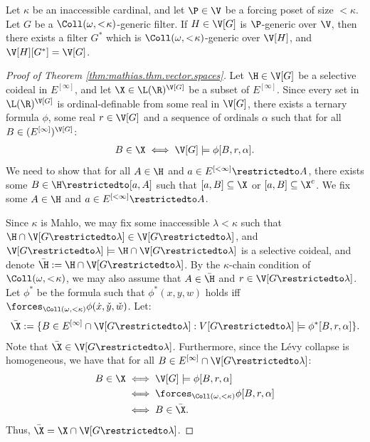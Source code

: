 \documentclass[11pt,reqno]{amsart}
\begin{document}
\begin{lemma}
\label{lem:solovay.factor.lemma}
    Let $\kappa$ be an inaccessible cardinal, and let $\P \in \V$ be a forcing poset of size $<\kappa$. Let $G$ be a $\Coll(\omega,<\!\kappa)$-generic filter. If $H \in \V[G]$ is $\P$-generic over $\V$, then there exists a filter $G^*$ which is $\Coll(\omega,<\!\kappa)$-generic over $\V[H]$, and $\V[H][G^*] = \V[G]$.
\end{lemma}

\begin{proof}[Proof of Theorem \ref{thm:mathias.thm.vector.spaces}]
    Let $\H \in \V[G]$ be a selective coideal in $E^{[\infty]}$, and let $\X \in \L(\R)^{\V[G]}$ be a subset of $E^{[\infty]}$. Since every set in $\L(\R)^{\V[G]}$ is ordinal-definable from some real in $\V[G]$, there exists a ternary formula $\phi$, some real $r \in \V[G]$ and a sequence of ordinals $\alpha$ such that for all $B \in (E^{[\infty]})^{\V[G]}$:
    \begin{align*}
        B \in \X \iff \V[G] \models \phi[B,r,\alpha].
    \end{align*}
    We need to show that for all $A \in \H$ and $a \in E^{[<\infty]}\restrictedto A$, there exists some $B \in \H\restrictedto[a,A]$ such that $[a,B] \subseteq \X$ or $[a,B] \subseteq \X^c$. We fix some $A \in \H$ and $a \in E^{[<\infty]}\restrictedto A$.

    Since $\kappa$ is Mahlo, we may fix some inaccessible $\lambda < \kappa$ such that $\H \cap \V[G\restrictedto\lambda] \in \V[G\restrictedto\lambda]$, and $\V[G\restrictedto\lambda] \models \H \cap \V[G\restrictedto\lambda]$ is a selective coideal, and denote $\bar{\H} := \H \cap \V[G\restrictedto\lambda]$. By the $\kappa$-chain condition of $\Coll(\omega,<\!\kappa)$, we may also assume that $A \in \bar{\H}$ and $r \in \V[G\restrictedto\lambda]$. Let $\phi^*$ be the formula such that $\phi^*(x,y,w)$ holds iff $\forces_{\Coll(\omega,<\kappa)} \phi(\dot{x},\check{y},\check{w})$. Let:
    \begin{align*}
        \bar{\X} := \{B \in E^{[\infty]} \cap \V[G\restrictedto\lambda] : V[G\restrictedto\lambda] \models \phi^*[B,r,\alpha]\}.
    \end{align*}
    Note that $\bar{\X} \in \V[G\restrictedto\lambda]$. Furthermore, since the L\'{e}vy collapse is homogeneous, we have that for all $B \in E^{[\infty]} \cap \V[G\restrictedto\lambda]$:
    \begin{align*}
        B \in \X &\iff \V[G] \models \phi[B,r,\alpha] \\
        &\iff \forces_{\Coll(\omega,<\kappa)} \phi[B,r,\alpha] \\
        &\iff B \in \bar{\X}.
    \end{align*}
    Thus, $\bar{\X} = \X \cap \V[G\restrictedto\lambda]$. 


\end{proof}
\end{document}
